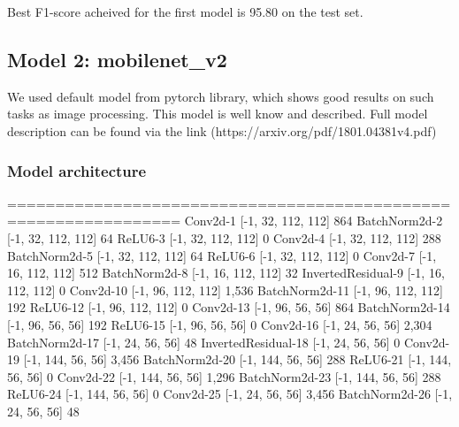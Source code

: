 \documentclass[11pt]{article}
\begin{document}
    Best F1-score acheived for the first model is 95.80 on the test set.

    \subsection{Model 2: mobilenet\_v2}\label{model-2-mobilenet_v2}

We used default model from pytorch library, which shows good results on
such tasks as image processing. This model is well know and described.
Full model description can be found via the link
(https://arxiv.org/pdf/1801.04381v4.pdf)

    \subsubsection{Model architecture}\label{model-architecture}
================================================================
            Conv2d-1         [-1, 32, 112, 112]             864
       BatchNorm2d-2         [-1, 32, 112, 112]              64
             ReLU6-3         [-1, 32, 112, 112]               0
            Conv2d-4         [-1, 32, 112, 112]             288
       BatchNorm2d-5         [-1, 32, 112, 112]              64
             ReLU6-6         [-1, 32, 112, 112]               0
            Conv2d-7         [-1, 16, 112, 112]             512
       BatchNorm2d-8         [-1, 16, 112, 112]              32
  InvertedResidual-9         [-1, 16, 112, 112]               0
           Conv2d-10         [-1, 96, 112, 112]           1,536
      BatchNorm2d-11         [-1, 96, 112, 112]             192
            ReLU6-12         [-1, 96, 112, 112]               0
           Conv2d-13           [-1, 96, 56, 56]             864
      BatchNorm2d-14           [-1, 96, 56, 56]             192
            ReLU6-15           [-1, 96, 56, 56]               0
           Conv2d-16           [-1, 24, 56, 56]           2,304
      BatchNorm2d-17           [-1, 24, 56, 56]              48
 InvertedResidual-18           [-1, 24, 56, 56]               0
           Conv2d-19          [-1, 144, 56, 56]           3,456
      BatchNorm2d-20          [-1, 144, 56, 56]             288
            ReLU6-21          [-1, 144, 56, 56]               0
           Conv2d-22          [-1, 144, 56, 56]           1,296
      BatchNorm2d-23          [-1, 144, 56, 56]             288
            ReLU6-24          [-1, 144, 56, 56]               0
           Conv2d-25           [-1, 24, 56, 56]           3,456
      BatchNorm2d-26           [-1, 24, 56, 56]              48
\end{document}
